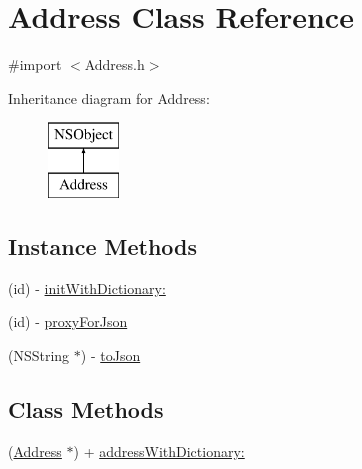 \hypertarget{interface_address}{\section{Address Class Reference}
\label{interface_address}
}


{\ttfamily \#import $<$Address.\-h$>$}

Inheritance diagram for Address\-:\begin{figure}[H]
\begin{center}
\leavevmode
\includegraphics[height=2.000000cm]{interface_address}
\end{center}
\end{figure}
\subsection*{Instance Methods}
\begin{DoxyCompactItemize}
\item 
(id) -\/ \hyperlink{interface_address_aaddeca97436531e934e9faabc74b5c81}{init\-With\-Dictionary\-:}
\item 
(id) -\/ \hyperlink{interface_address_a3f23d482eaeb09f3a874c93bc0985675}{proxy\-For\-Json}
\item 
(N\-S\-String $\ast$) -\/ \hyperlink{interface_address_a0a3ad7a9d7fdca9ff412ea5c5a85fabe}{to\-Json}
\end{DoxyCompactItemize}
\subsection*{Class Methods}
\begin{DoxyCompactItemize}
\item 
(\hyperlink{interface_address}{Address} $\ast$) + \hyperlink{interface_address_acedade83516d78418c2208c113b21092}{address\-With\-Dictionary\-:}
\end{DoxyCompactItemize}
